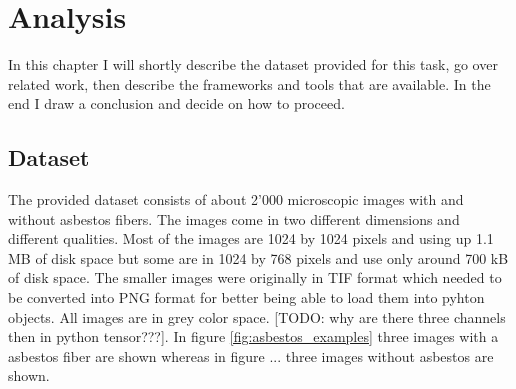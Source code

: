 \chapter{Analysis}

In this chapter I will shortly describe the dataset provided for this task, go over related work, then describe the frameworks and tools that are available. In the end I draw a conclusion and decide on how to proceed.

\section{Dataset}

The provided dataset consists of about 2'000 microscopic images with and without asbestos fibers. The images come in two different dimensions and different qualities. Most of the images are 1024 by 1024 pixels and using up 1.1 MB of disk space but some are in 1024 by 768 pixels and use only around 700 kB of disk space. The smaller images were originally in TIF format which needed to be converted into PNG format for better being able to load them into pyhton objects. All images are in grey color space. [TODO: why are there three channels then in python tensor???]. In figure \ref{fig:asbestos_examples} three images with a asbestos fiber are shown whereas in figure ... three images without asbestos are shown.

